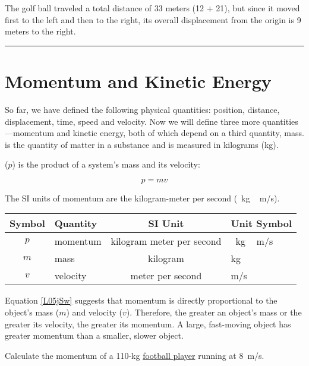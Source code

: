 \documentclass{article}
\begin{document}
The golf ball traveled a total distance of 33 meters (12 + 21), but since it moved first to the left and then to the right, its overall displacement from the origin is 9 meters to the right.

\hrule

\section{Momentum and Kinetic Energy} \label{yUPGRH}

So far, we have defined the following physical quantities: position, distance, displacement, time, speed and velocity. Now we will define three more quantities---momentum and kinetic energy, both of which depend on a third quantity, mass.  is the quantity of matter in a substance and is measured in kilograms (kg). 

\vspace{1em}

 ($p$) is the product of a system's mass and its velocity:

\begin{equation} \label{L05jSw}
    p = m v
\end{equation}

The SI units of momentum are the kilogram-meter per second (\SI{}{kg\,m/s}).

\begin{center}
    \begin{tabular}{cl|cl}
    \hline
    \textbf{Symbol} & \textbf{Quantity} & \textbf{SI Unit} & \textbf{Unit Symbol}  \\
    \hline\hline
    \rule{0pt}{2.5ex}
        $p$ & momentum & kilogram meter per second & \SI{}{kg\,m/s}\\
        $m$ & mass & kilogram & kg\\
        $v$ & velocity & meter per second & m/s\\
    \hline
    \end{tabular}
\end{center}

Equation \eqref{L05jSw} suggests that momentum is directly proportional to the object's mass ($m$) and velocity ($v$). Therefore, the greater an object's mass or the greater its velocity, the greater its momentum. A large, fast-moving object has greater momentum than a smaller, slower object. 

\begin{example} \label{lMBh9H}
    Calculate the momentum of a 110-kg \href{https://youtu.be/hxMaoFcYSrw}{football player} running at \SI{8}{m/s}.
\end{example}
\end{document}
